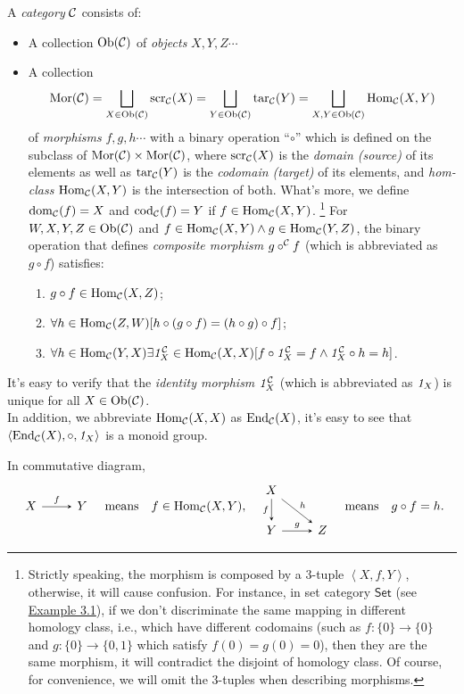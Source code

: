 \documentclass{article}
\begin{document}
\begin{defi}\label{category}
	A \emph{category} $\mathcal{C}$ consists of:
	\begin{itemize}
		\item A collection $\mathrm{Ob}(\mathcal{C})$ of \emph{objects} $X,Y,Z\cdots$
		\item A collection 
			$$\mathrm{Mor}(\mathcal{C})=\bigsqcup_{X\in\mathrm{Ob}(\mathcal{C})}{\mathrm{scr}_{\mathcal{C}}(X)}=\bigsqcup_{Y\in\mathrm{Ob}(\mathcal{C})}{\mathrm{tar}_{\mathcal{C}}(Y)}=\bigsqcup_{X,Y\in\mathrm{Ob}(\mathcal{C})}{\mathrm{Hom}_{\mathcal{C}}(X,Y)}$$
			of \emph{morphisms} $f,g,h\cdots$ with a binary operation ``$\circ$'' which is defined on the subclass of $\mathrm{Mor}(\mathcal{C})\times\mathrm{Mor}(\mathcal{C})$, where $\mathrm{scr}_{\mathcal{C}}(X)$ is the \emph{domain (source)} of its elements as well as $\mathrm{tar}_{\mathcal{C}}(Y)$ is the \emph{codomain (target)} of its elements, and \emph{hom-class} $\mathrm{Hom}_{\mathcal{C}}(X,Y)$ is the intersection of both. What's more, we define $\mathrm{dom}_{\mathcal{C}}(f)=X$ and $\mathrm{cod}_{\mathcal{C}}(f)=Y$ if $f\in\mathrm{Hom}_{\mathcal{C}}(X,Y)$.
				\footnote{\label{sign} Strictly speaking, the morphism is composed by a 3-tuple $\left<X,f,Y\right>$, otherwise, it will cause confusion. For instance, in set category $\mathsf{Set}$ (see \hyperref[exm3]{Example 3.1}), if we don't discriminate the same mapping in different homology class, i.e., which have different codomains (such as $f:\{0\}\to\{0\}$ and $g:\{0\}\to\{0,1\}$ which satisfy $f(0)=g(0)=0$), then they are the same morphism, it will contradict the disjoint of homology class. Of course, for convenience, we will omit the 3-tuples when describing morphisms.}
			For $W,X,Y,Z\in\mathrm{Ob}(\mathcal{C})$ and $f\in\mathrm{Hom}_{\mathcal{C}}(X,Y)\wedge g\in\mathrm{Hom}_{\mathcal{C}}(Y,Z)$, the binary operation that defines \emph{composite morphism} $g\circ^{\mathcal{C}} f$ (which is abbreviated as $g\circ f$) satisfies:
			\begin{enumerate}
				\item $g\circ f\in\mathrm{Hom}_{\mathcal{C}}(X,Z)$;
				\item $\forall h\in\mathrm{Hom}_{\mathcal{C}}(Z,W)[h\circ(g\circ f)=(h\circ g)\circ f]$;
				\item $\forall h\in\mathrm{Hom}_{\mathcal{C}}(Y,X)\exists \mathit{1}^{\mathcal{C}}_X\in\mathrm{Hom}_{\mathcal{C}}(X,X)[f\circ\mathit{1}^{\mathcal{C}}_X=f\wedge\mathit{1}^{\mathcal{C}}_X\circ h=h]$.
			\end{enumerate}
	\end{itemize}
	
	It's easy to verify that the \emph{identity morphism} $\mathit{1}^{\mathcal{C}}_X$ (which is abbreviated as $\mathit{1}_X$) is unique for all $X\in\mathrm{Ob}(\mathcal{C})$.\\
	In addition, we abbreviate $\mathrm{Hom}_{\mathcal{C}}(X,X)$ as $\mathrm{End}_{\mathcal{C}}(X)$, it's easy to see that $\left<\mathrm{End}_{\mathcal{C}}(X),\circ,\mathit{1}_X\right>$ is a monoid group.
	
	In commutative diagram,
	\[\begin{tikzcd}
			X\arrow[->,>=stealth,r,"f"] & Y
		\end{tikzcd}\quad\text{means}\quad f\in\Hom_\ca(X,Y),\quad
		\begin{tikzcd}
			X\arrow[->,>=stealth,d,"f"'] \arrow[->,>=stealth,rd,"h"] & \\
			Y\arrow[->,>=stealth,r,"g"] & Z
	\end{tikzcd}\quad\text{means}\quad g\circ f=h.\]
\end{defi}
\end{document}
